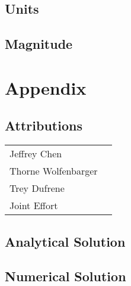 \documentclass[12pt]{report}
\begin{document}
\begin{flushleft}
\subsection{Units}

\subsection{Magnitude}

\section{Appendix} \label{appendix}

\subsection{Attributions}

\onehalfspacing
\begin{tabular}{ll}
Jeffrey Chen & \\
Thorne Wolfenbarger & \\
Trey Dufrene & \\
Joint Effort &
\end{tabular}
\singlespacing

\subsection{Analytical Solution}

\subsection{Numerical Solution} \label{appendix:numerical}


\end{flushleft}
\end{document}
